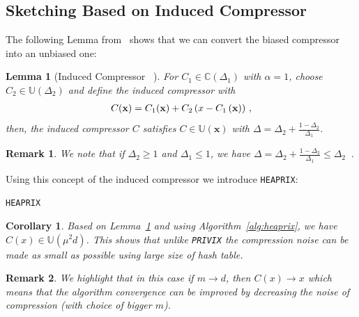 \documentclass[twoside]{article}
\newtheorem{lemma}{Lemma}
\newtheorem{remark}{Remark}
\newtheorem{corollary}{Corollary}
\begin{document}
\subsection{Sketching Based on Induced Compressor}
The following Lemma from~\cite{horvath2020better} shows that we can convert the biased compressor into an unbiased one: 
\begin{lemma}[Induced Compressor ~\cite{horvath2020better}]\label{lemm:induced_compress}
For $C_1\in \mathbb{C}(\Delta_1)$ with $\alpha=1$, choose $C_2\in \mathbb{U}(\Delta_2)$ and define the induced compressor with
\begin{align}\notag
    C(\mathbf{x})=C_1(\mathbf{x})+C_2\left(x-C_1\left(\mathbf{x}\right)\right)\, ,
\end{align}
then, the induced compressor $C$ satisfies $C\in\mathbb{U}(\mathbf{x})$ with $\Delta=\Delta_2+\frac{1-\Delta_2}{\Delta_1}$.
\end{lemma}
\begin{remark}
We note that if $\Delta_2\geq 1$ and $\Delta_1\leq 1$, we have $\Delta=\Delta_2+\frac{1-\Delta_2}{\Delta_1}\leq \Delta_2$\, .
\end{remark}
Using this concept of the induced compressor we introduce \texttt{HEAPRIX}:
\begin{algorithm}[t]
\caption{\texttt{HEAPRIX} }\label{alg:heaprix}
\begin{algorithmic}[1]
\end{algorithmic}
\end{algorithm}


\begin{corollary}
Based on Lemma~\ref{lemm:induced_compress} and using Algorithm~\ref{alg:heaprix}, we have $C(x)\in \mathbb{U}(\mu^2 d)$. This shows that unlike \texttt{PRIVIX} the compression noise can be made as small as possible using large size of hash table.
\end{corollary}
\begin{remark}
We highlight that in this case if $m\rightarrow d$, then $C(x)\rightarrow x$ which means that the algorithm convergence can be improved by decreasing the noise of compression (with choice of bigger $m$). 
\end{remark}
\end{document}
